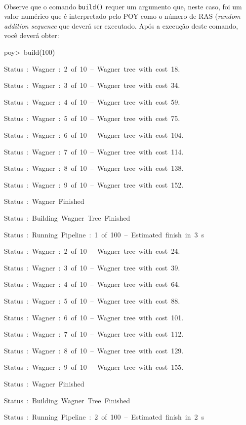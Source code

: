 \begin{refsection}
\\

Observe que o comando \texttt{build()} requer um argumento que, neste caso, foi um valor numérico que é interpretado pelo POY como o número de RAS (\textit{random addition sequence} que deverá ser executado. Após a execução deste comando, você deverá obter:\\

\scriptsize

poy>~build(100)

Status~:~Wagner~:~2~of~10~--~Wagner~tree~with~cost~18.

Status~:~Wagner~:~3~of~10~--~Wagner~tree~with~cost~34.

Status~:~Wagner~:~4~of~10~--~Wagner~tree~with~cost~59.

Status~:~Wagner~:~5~of~10~--~Wagner~tree~with~cost~75.

Status~:~Wagner~:~6~of~10~--~Wagner~tree~with~cost~104.

Status~:~Wagner~:~7~of~10~--~Wagner~tree~with~cost~114.

Status~:~Wagner~:~8~of~10~--~Wagner~tree~with~cost~138.

Status~:~Wagner~:~9~of~10~--~Wagner~tree~with~cost~152.

Status~:~Wagner~Finished

Status~:~Building~Wagner~Tree~Finished

Status~:~Running~Pipeline~:~1~of~100~--~Estimated~finish~in~3~s

Status~:~Wagner~:~2~of~10~--~Wagner~tree~with~cost~24.

Status~:~Wagner~:~3~of~10~--~Wagner~tree~with~cost~39.

Status~:~Wagner~:~4~of~10~--~Wagner~tree~with~cost~64.

Status~:~Wagner~:~5~of~10~--~Wagner~tree~with~cost~88.

Status~:~Wagner~:~6~of~10~--~Wagner~tree~with~cost~101.

Status~:~Wagner~:~7~of~10~--~Wagner~tree~with~cost~112.

Status~:~Wagner~:~8~of~10~--~Wagner~tree~with~cost~129.

Status~:~Wagner~:~9~of~10~--~Wagner~tree~with~cost~155.

Status~:~Wagner~Finished

Status~:~Building~Wagner~Tree~Finished

Status~:~Running~Pipeline~:~2~of~100~--~Estimated~finish~in~2~s


\end{refsection}
